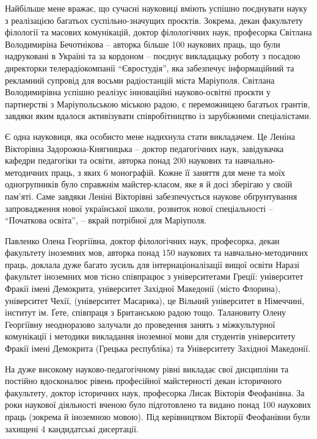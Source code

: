 
Найбільше мене вражає, що сучасні науковиці вміють успішно поєднувати науку з
реалізацією багатьох суспільно-значущих проєктів. Зокрема, декан факультету
філології та масових комунікацій, доктор філологічних наук, професорка Світлана
Володимиріна Бечотнікова – авторка більше 100 наукових праць, що були
надруковані в Україні та за кордоном – поєднує викладацьку роботу з посадою
директорки телерадіокомпанії \enquote{Євростудія}, яка забезпечує інформаційний та
рекламний супровід для восьми радіостанцій міста Маріуполя. Світлана
Володимирівна успішно реалізує інноваційні науково-освітні проєкти у
партнерстві з Маріупольською міською радою, є переможницею багатьох грантів,
завдяки яким вдалося активізувати співробітництво із зарубіжними спеціалістами.

Є одна науковиця, яка особисто мене надихнула стати викладачем. Це Леніна
Вікторівна Задорожна-Княгницька – доктор педагогічних наук, завідувачка кафедри
педагогіки та освіти,  авторка понад 200 наукових та навчально-методичних
праць, з яких 6 монографій. Кожне її заняття для мене та моїх одногрупників
було справжнім майстер-класом, яке я й досі зберігаю у своїй пам'яті. Саме
завдяки Леніні Вікторівні забезпечується наукове обґрунтування запровадження
нової української школи, розвиток нової спеціальності – \enquote{Початкова освіта}, –
вкрай потрібної для Маріуполя.


Павленко Олена Георгіївна, доктор філологічних наук, професорка, декан
факультету іноземних мов, авторка понад 150 наукових та навчально-методичних
праць, доклала дуже багато зусиль для інтернаціоналізації вищої освіти Наразі
факультет іноземних мов тісно співпрацює з університетами Греції: університет
Фракії імені Демокрита, університет Західної Македонії (місто Флорина),
університет Чехії, (університет Масарика), це Вільний університет в Німеччині,
інститут ім. Ґете, співпраця з Британською радою тощо. Талановиту Олену
Георгіївну неодноразово залучали до проведення занять з міжкультурної
комунікації і методики викладання іноземної мови для студентів університету
Фракії імені Демокрита (Грецька республіка) та Університету Західної Македонії.


На дуже високому науково-педагогічному рівні викладає свої дисципліни та
постійно вдосконалює рівень професійної майстерності декан історичного
факультету, доктор історичних наук, професорка Лисак Вікторія Феофанівна. За
роки наукової діяльності вченою було підготовлено та видано понад 100 наукових
праць (зокрема й іноземною мовою). Під керівництвом Вікторії Феофанівни були
захищені 4 кандидатські дисертації.

